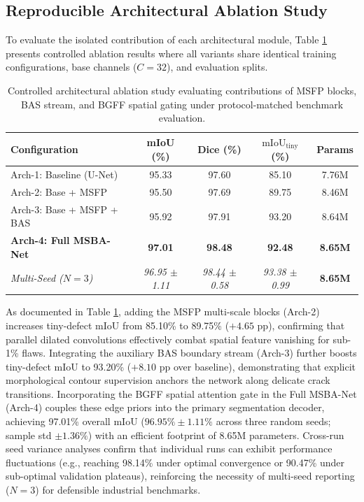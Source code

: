 \documentclass{ieeeaccess}
\begin{document}
\subsection{Reproducible Architectural Ablation Study}
To evaluate the isolated contribution of each architectural module, Table \ref{tab:ablation} presents controlled ablation results where all variants share identical training configurations, base channels ($C=32$), and evaluation splits.

\begin{table}[!t]
\centering
\setlength{\tabcolsep}{1.8pt}
\fontsize{6.8pt}{8.8pt}\selectfont
\caption{Controlled architectural ablation study evaluating contributions of MSFP blocks, BAS stream, and BGFF spatial gating under protocol-matched benchmark evaluation.}
\label{tab:ablation}
\begin{tabular*}{\columnwidth}{@{\extracolsep{\fill}}lcccc@{}}
\toprule
\textbf{Configuration} & \textbf{mIoU (\%)} & \textbf{Dice (\%)} & $\text{mIoU}_{\text{tiny}}$ \textbf{(\%)} & \textbf{Params} \\
\midrule
Arch-1: Baseline (U-Net) & 95.33 & 97.60 & 85.10 & 7.76M \\
Arch-2: Base + MSFP & 95.50 & 97.69 & 89.75 & 8.46M \\
Arch-3: Base + MSFP + BAS & 95.92 & 97.91 & 93.20 & 8.64M \\
\textbf{Arch-4: Full MSBA-Net} & \textbf{97.01} & \textbf{98.48} & \textbf{92.48} & \textbf{8.65M} \\
\textit{Multi-Seed ($N=3$)} & \textit{96.95 $\pm$ 1.11} & \textit{98.44 $\pm$ 0.58} & \textit{93.38 $\pm$ 0.99} & \textbf{8.65M} \\
\bottomrule
\end{tabular*}
\end{table}

As documented in Table \ref{tab:ablation}, adding the MSFP multi-scale blocks (Arch-2) increases tiny-defect mIoU from 85.10\% to 89.75\% ($+4.65\text{ pp}$), confirming that parallel dilated convolutions effectively combat spatial feature vanishing for sub-1\% flaws. Integrating the auxiliary BAS boundary stream (Arch-3) further boosts tiny-defect mIoU to 93.20\% ($+8.10\text{ pp}$ over baseline), demonstrating that explicit morphological contour supervision anchors the network along delicate crack transitions. Incorporating the BGFF spatial attention gate in the Full MSBA-Net (Arch-4) couples these edge priors into the primary segmentation decoder, achieving 97.01\% overall mIoU ($96.95\% \pm 1.11\%$ across three random seeds; sample std $\pm 1.36\%$) with an efficient footprint of 8.65M parameters. Cross-run seed variance analyses confirm that individual runs can exhibit performance fluctuations (e.g., reaching 98.14\% under optimal convergence or 90.47\% under sub-optimal validation plateaus), reinforcing the necessity of multi-seed reporting ($N=3$) for defensible industrial benchmarks.
\end{document}
